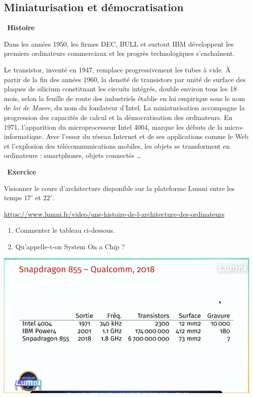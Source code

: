 \documentclass[a4paper, french, 11pt]{article}  %
\newcounter{rque}
\newcounter{cours}
\newcounter{exercice}
\newenvironment{exercice}[1]
{\par \medskip   \addtocounter{exercice}{1} \noindent  
\begin{bclogo}[arrondi =0.1,   noborder = true, logo=\bccrayon, marge=4]{~\textbf{Exercice} \textbf{\theexercice} {\itshape #1} }  \par}
{
\end{bclogo}
 \par \bigskip }
\newcounter{prog}
\newcounter{histo}
\newenvironment{histoire}[1]
{\par \medskip   \addtocounter{histo}{1} \noindent  
 \begin {bclogo}[couleur = blue!10 , arrondi =0.1,logo=\bchorloge, marge=4] {~\textbf{Histoire} \textbf{\thehisto} {\itshape #1} }  \par}
{
\end{bclogo}
 \par \bigskip }
\begin{document}
\subsection{Miniaturisation et démocratisation}

\begin{histoire}{}
Dans les années 1950, les firmes DEC, BULL et surtout IBM développent les premiers ordinateurs commerciaux et les progrès technologiques s'enchaînent. 

Le transistor, inventé en 1947, remplace progressivement les tubes à vide. À partir de la fin des années 1960, la densité de transistors par unité de surface des plaques de silicium constituant les circuits intégrés, double environ tous les 18 mois, selon la feuille de route des industriels établie en loi empirique sous le nom de \textit{loi de Moore}, du nom du fondateur d'Intel. La miniaturisation accompagne la progression des capacités de calcul et la démocratisation des ordinateurs. En 1971, l'apparition du microprocesseur Intel 4004, marque les débuts de la micro-informatique. Avec l'essor du réseau Internet et de ses applications comme le Web et l'explosion des télécommunications mobiles, les objets se transforment en ordinateurs : smartphones, objets connectés  \ldots 
\end{histoire}

\begin{exercice}{}
Visionner le cours d'architecture disponible sur la plateforme Lumni  entre les temps $17'$ et $22'$.  


\url{https://www.lumni.fr/video/une-histoire-de-l-architecture-des-ordinateurs}


\begin{enumerate}
	\item Commenter le tableau ci-dessous.
	\item Qu'appelle-t-on System On a Chip ?
\end{enumerate}




\begin{center}
\includegraphics[scale=0.3]{images/miniaturisation.png}
\end{center}

\end{exercice}
\end{document}
